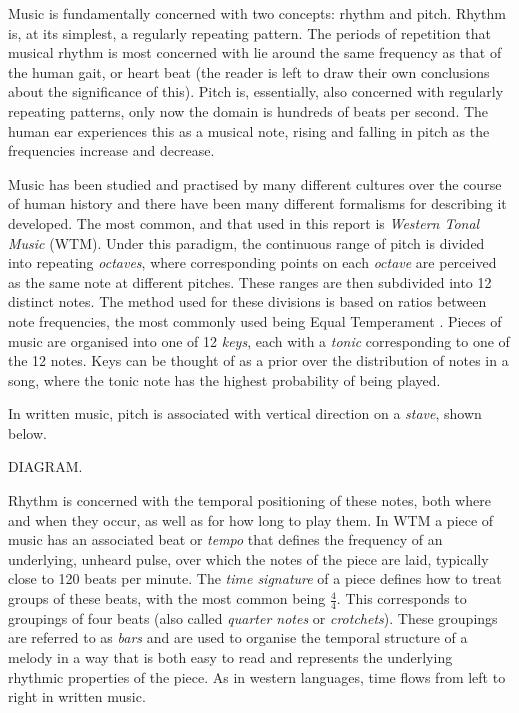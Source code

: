 \documentclass[bsc,singlespacing,logo, parskip, deptreport]{infthesis}
\begin{document}
Music is fundamentally concerned with two concepts: rhythm and pitch. Rhythm is, at its simplest, a regularly repeating pattern. The periods of repetition that musical rhythm is most concerned with lie around the same frequency as that of the human gait, or heart beat (the reader is left to draw their own conclusions about the significance of this). Pitch is, essentially, also concerned with regularly repeating patterns, only now the domain is hundreds of beats per second. The human ear experiences this as a musical note, rising and falling in pitch as the frequencies increase and decrease.

Music has been studied and practised by many different cultures over the course of human history and there have been many different formalisms for describing it developed. The most common, and that used in this report is {\em Western Tonal Music} (WTM). Under this paradigm, the continuous range of pitch is divided into repeating {\em octaves}, where corresponding points on each {\em octave} are perceived as the same note at different pitches. These ranges are then subdivided into 12 distinct notes. The method used for these divisions is based on ratios between note frequencies, the most commonly used being Equal Temperament \cite{regener1973pitch}. Pieces of music are organised into one of 12 {\em keys}, each with a {\em tonic} corresponding to one of the 12 notes. Keys can be thought of as a prior over the distribution of notes in a song, where the tonic note has the highest probability of being played.

In written music, pitch is associated with vertical direction on a {\em stave}, shown below.

DIAGRAM.

Rhythm is concerned with the temporal positioning of these notes, both where and when they occur, as well as for how long to play them. In WTM a piece of music has an associated beat or {\em tempo} that defines the frequency of an underlying, unheard pulse, over which the notes of the piece are laid, typically close to 120 beats per minute. The {\em time signature} of a piece defines how to treat groups of these beats, with the most common being $\frac{4}{4}$. This corresponds to groupings of four beats (also called {\em quarter notes} or {\em crotchets}). These groupings are referred to as {\em bars} and are used to organise the temporal structure of a melody in a way that is both easy to read and represents the underlying rhythmic properties of the piece. As in western languages, time flows from left to right in written music.
\end{document}
